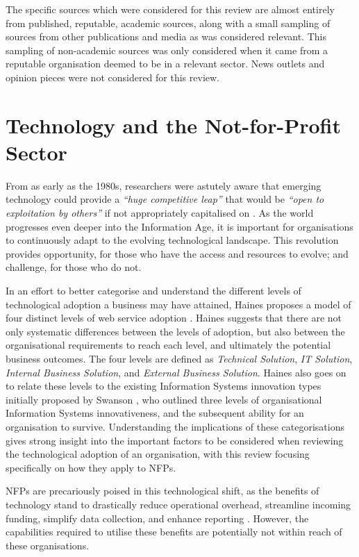 The specific sources which were considered for this review are almost entirely from published, reputable, academic sources, along with a small sampling of sources from other publications and media as was considered relevant. This sampling of non-academic sources was only considered when it came from a reputable organisation deemed to be in a relevant sector. News outlets and opinion pieces were not considered for this review.

\section{Technology and the Not-for-Profit Sector}

From as early as the 1980s, researchers were astutely aware that emerging technology could provide a \emph{“huge competitive leap”} that would be \emph{“open to exploitation by others”} if not appropriately capitalised on \cite[p.~11]{benjamin1983information}. As the world progresses even deeper into the Information Age, it is important for organisations to continuously adapt to the evolving technological landscape. This revolution provides opportunity, for those who have the access and resources to evolve; and challenge, for those who do not.

In an effort to better categorise and understand the different levels of technological adoption a business may have attained, Haines proposes a model of four distinct levels of web service adoption \cite{haines2003levels}. Haines suggests that there are not only systematic differences between the levels of adoption, but also between the organisational requirements to reach each level, and ultimately the potential business outcomes. The four levels are defined as \emph{Technical Solution}, \emph{IT Solution}, \emph{Internal Business Solution}, and \emph{External Business Solution}. Haines also goes on to relate these levels to the existing Information Systems innovation types initially proposed by Swanson \cite{swanson1994information}, who outlined three levels of organisational Information Systems innovativeness, and the subsequent ability for an organisation to survive. Understanding the implications of these categorisations gives strong insight into the important factors to be considered when reviewing the technological adoption of an organisation, with this review focusing specifically on how they apply to NFPs.

NFPs are precariously poised in this technological shift, as the benefits of technology stand to drastically reduce operational overhead, streamline incoming funding, simplify data collection, and enhance reporting \cite{boles2013technology} \cite{bopp2017disempowered}. However, the capabilities required to utilise these benefits are potentially not within reach of these organisations.

